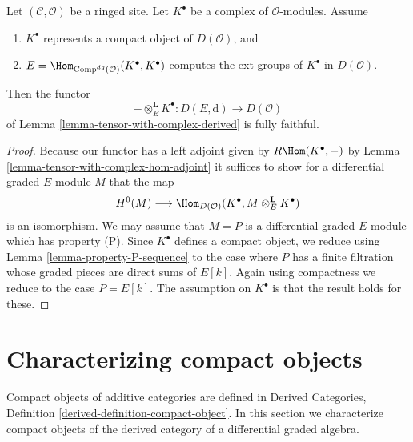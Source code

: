 \begin{lemma}
\label{lemma-fully-faithful-in-compact-case}
Let $(\mathcal{C}, \mathcal{O})$ be a ringed site.
Let $K^\bullet$ be a complex of $\mathcal{O}$-modules.
Assume
\begin{enumerate}
\item $K^\bullet$ represents a compact object of $D(\mathcal{O})$, and
\item $E = \Hom_{\text{Comp}^{dg}(\mathcal{O})}(K^\bullet, K^\bullet)$
computes the ext groups of $K^\bullet$ in $D(\mathcal{O})$.
\end{enumerate}
Then the functor
$$
- \otimes_E^\mathbf{L} K^\bullet :
D(E, \text{d})
\longrightarrow
D(\mathcal{O})
$$
of Lemma \ref{lemma-tensor-with-complex-derived} is fully faithful.
\end{lemma}

\begin{proof}
Because our functor has a left adjoint given by
$R\Hom(K^\bullet, -)$ by Lemma \ref{lemma-tensor-with-complex-hom-adjoint}
it suffices to show for a differential graded $E$-module $M$ that the map
$$
H^0(M) \longrightarrow
\Hom_{D(\mathcal{O})}(K^\bullet, M \otimes_E^\mathbf{L} K^\bullet)
$$
is an isomorphism. We may assume that $M = P$ is a differential graded
$E$-module which has property (P). Since $K^\bullet$ defines a
compact object, we reduce using
Lemma \ref{lemma-property-P-sequence}
to the case where $P$ has a finite filtration whose graded pieces
are direct sums of $E[k]$. Again using compactness we reduce
to the case $P = E[k]$. The assumption on $K^\bullet$ is that
the result holds for these.
\end{proof}











\section{Characterizing compact objects}
\label{section-compact}

\noindent
Compact objects of additive categories are defined in
Derived Categories, Definition \ref{derived-definition-compact-object}.
In this section we characterize compact objects of the derived
category of a differential graded algebra.

